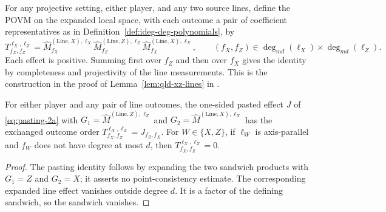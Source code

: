 \begin{definition}
	\label{def:concrete-paired-line-measurement}
	\leanok
	For any projective setting, either player, and any two source lines,
	define the POVM on the expanded local space, with each outcome a pair
	of coefficient representatives as in
	Definition~\ref{def:ideg-deg-polynomials}, by
	\[
		T^{\ell_X,\ell_Z}_{f_X,f_Z}
		=\hat M^{(\mathrm{Line},X),\ell_X}_{f_X}
		 \hat M^{(\mathrm{Line},Z),\ell_Z}_{f_Z}
		 \hat M^{(\mathrm{Line},X),\ell_X}_{f_X},
		\qquad (f_X,f_Z)\in\deg_{md}(\ell_X)\times\deg_{md}(\ell_Z).
	\]
	Each effect is positive. Summing first over $f_Z$ and then over $f_X$
	gives the identity by completeness and projectivity of the line
	measurements. This is the construction in the proof of
	Lemma~\ref{lem:qld-xz-lines} in \cite{Ji2020MIPStar}.
\end{definition}

\begin{lemma}
	\label{lem:concrete-paired-line-degree-support}
	\leanok
	For either player and any pair of line outcomes, the one-sided pasted
	effect $J$ of \eqref{eq:pasting-2a} with
	$G_1=\hat M^{(\mathrm{Line},Z),\ell_Z}$ and
	$G_2=\hat M^{(\mathrm{Line},X),\ell_X}$ has the exchanged outcome order
	$T^{\ell_X,\ell_Z}_{f_X,f_Z}=J_{f_Z,f_X}$.
	For $W\in\{X,Z\}$, if $\ell_W$ is axis-parallel
	and $f_W$ does not have degree at most $d$, then
	$T^{\ell_X,\ell_Z}_{f_X,f_Z}=0$.
\end{lemma}
\begin{proof}
	\leanok
	The pasting identity follows by expanding the two sandwich products with
	$G_1=Z$ and $G_2=X$; it asserts no point-consistency estimate.
	The corresponding expanded line effect vanishes outside degree $d$.
	It is a factor of the defining sandwich, so the sandwich vanishes.
\end{proof}

